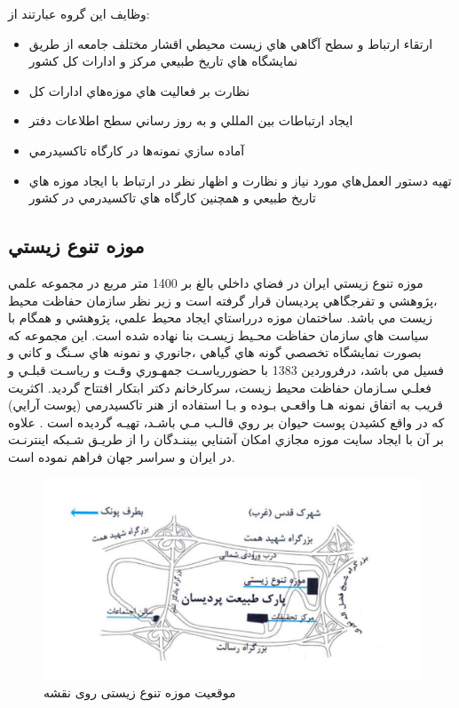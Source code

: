 وظایف این گروه عبارتند از:

\begin{itemize}
    \item ارتقاء ارتباط و سطح آگاهي هاي زيست محيطي اقشار مختلف جامعه از طريق نمايشگاه
    هاي تاريخ طبيعي مركز و ادارات كل كشور
    \item نظارت بر فعاليت هاي موزه‌هاي ادارات كل
    \item ايجاد ارتباطات بين المللي و به روز رساني سطح اطلاعات دفتر
    \item آماده سازي نمونه‌ها در كارگاه تاكسيدرمي
    \item تهيه دستور العمل‌هاي مورد نياز و نظارت و اظهار نظر در ارتباط با ايجاد موزه هاي تاريخ
    طبيعي و همچنين كارگاه هاي تاكسيدرمي در كشور
\end{itemize}

\subsection{موزه تنوع زيستي}
موزه تنوع زيستي ايران در فضاي داخلي بالغ بر 1400 متر مربع در مجموعه علمي ،پژوهشي و تفرجگاهي
پرديسان قرار گرفته است و زير نظر سازمان حفاظت محيط زيست مي باشد. 
ساختمان موزه درراستاي ايجاد محيط علمي، پژوهشي و همگام با سياست هاي سازمان حفاظت محـيط زيسـت
بنا نهاده شده است. اين مجموعه كه بصورت نمايشگاه تخصصي گونه هاي گياهي ،جانوري و نمونه هاي سـنگ و
كاني و فسيل مي باشد، درفروردين 1383 با حضوررياسـت جمهـوري وقـت و رياسـت قبلـي و فعلـي سـازمان
حفاظت محيط زيست، سركارخانم دكتر ابتكار افتتاح گرديد. اكثريت قريب به اتفاق نمونه هـا واقعـي بـوده و بـا
استفاده از هنر تاكسيدرمي (پوست آرايي) كه در واقع كشيدن پوست حيوان بر روي قالـب مـي باشـد، تهيـه
گرديده است . علاوه بر آن با ايجاد سايت موزه مجازي امكان آشنايي بيننـدگان را از طريـق شـبكه اينترنـت در
ايران و سراسر جهان فراهم نموده است.

\begin{figure}
    \label{fig2.1}
    \centering
    \includegraphics[scale = 0.5]{images/map.PNG}
    \caption{موقعیت موزه تنوع زیستی روی نقشه}
\end{figure}

